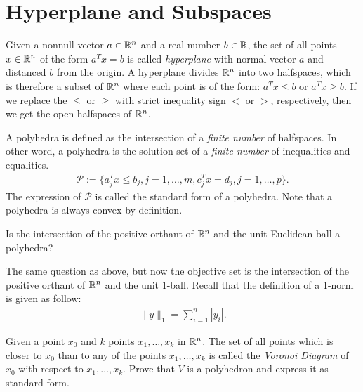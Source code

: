 \documentclass[a4paper, 12pt]{book}
\begin{document}



\section{Hyperplane and Subspaces}
\label{sec:hyperplane_and_subspaces}

Given a nonnull vector $a \in \mathbb{R}^n$ and a real number $b \in \mathbb{R}$, the set of all points $x \in \mathbb{R}^n$ of the form $a^T x = b$ is called \emph{hyperplane} with normal vector $a$ and distanced $b$ from the origin. A hyperplane divides $\mathbb{R}^n$ into two halfspaces, which is therefore a subset of $\mathbb{R}^n$ where each point is of the form: $a^T x \leq b$ or $a^T x \geq b$. If we replace the $\leq$ or $\geq$ with strict inequality sign $<$ or $>$, respectively, then we get the open halfspaces of $\mathbb{R}^n$.

A polyhedra is defined as the intersection of a \emph{finite number} of halfspaces. In other word, a polyhedra is the solution set of a \emph{finite number} of inequalities and equalities.
\begin{align*}
    \mathcal{P} := \{ a_j^T x \leq b_j, j = 1, \dots, m, c_j^T x = d_j, j = 1, \dots, p \}.
\end{align*}
The expression of $\mathcal{P}$ is called the standard form of a polyhedra. Note that a polyhedra is always convex by definition.

\begin{exercise}
    Is the intersection of the positive orthant of $\mathbb{R}^n$ and the unit Euclidean ball a polyhedra?
\end{exercise}

\begin{exercise}
    The same question as above, but now the objective set is the intersection of the positive orthant of $\mathbb{R}^n$ and the unit 1-ball. Recall that the definition of a 1-norm is given as follow:
    \begin{align*}
        \| y \|_1 = \sum_{i=1}^n |y_i|.
    \end{align*}
\end{exercise}

\begin{exercise}
    Given a point $x_0$ and $k$ points $x_1, \dots, x_k$ in $\mathbb{R}^n$. The set of all points which is closer to $x_0$ than to any of the points $x_1, \dots, x_k$ is called the \emph{Voronoi Diagram} of $x_0$ with respect to $x_1, \dots, x_k$.
    Prove that $V$ is a polyhedron and express it as standard form.
\end{exercise}
\end{document}
